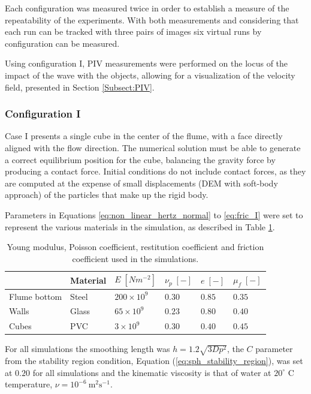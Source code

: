 Each configuration was measured twice in order to establish a measure of the repeatability of the experiments. With both measurements and considering that each run can be tracked with three pairs of images six virtual runs by configuration can be measured.

Using configuration I, \ac{PIV} measurements were performed on the locus of the impact of the wave with the objects, allowing for a visualization of the velocity field, presented in Section \ref{Subsect:PIV}.

\subsubsection{Configuration I}
\label{Subsect:config_I}
%
Case I presents a single cube in the center of the flume, with a face directly aligned with the flow direction. The numerical solution must be able to generate a correct equilibrium position for the cube, balancing the gravity force by producing a contact force. Initial conditions do not include contact forces, as they are computed at the expense of small displacements (DEM with soft-body approach) of the particles that make up the rigid body. 

Parameters in Equations \eqref{eq:non_linear_hertz_normal} to \eqref{eq:fric_I} were set to represent the various materials in the simulation, as described in Table \ref{tab:material_props_cubes}.
%
\begin{table}[h]
\centering
\begin{tabular}{l|l|llll}
 & Material & $E\;[Nm^{-2}]$ & $\nu_p\;[-]$  & $e\;[-]$ & $\mu_f\;[-]$\\ \hline
Flume bottom & Steel & $200\times10^9$ & $0.30$ & $0.85$ & $0.35$ \\
Walls & Glass & $65\times10^9$ & $0.23$ & $0.80$ & $0.40$ \\
Cubes & PVC & $3\times10^9$ & $0.30$ & $0.40$ & $0.45$
\end{tabular}
\caption{Young modulus, Poisson coefficient, restitution coefficient and friction coefficient used in the simulations.}
\label{tab:material_props_cubes}
\end{table}
%

For all simulations the smoothing length was $h=1.2\sqrt{3Dp^2}$, the $C$ parameter from the stability region condition, Equation (\eqref{eq:sph_stability_region}), was set at $0.20$ for all simulations and the kinematic viscosity is that of water at $20^{\circ}$ C temperature, $\nu = 10^{-6} \  \mathrm{m^2 s^{-1}}$.

